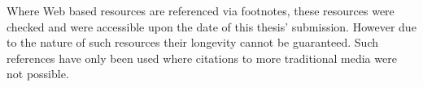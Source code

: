 Where Web based resources are referenced via footnotes, these resources were checked and were accessible upon the date of this thesis' submission. However due to the nature of such resources their longevity cannot be guaranteed. Such references have only been used where citations to more traditional media were not possible.